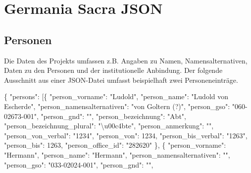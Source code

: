 \documentclass[ngerman,]{scrreprt}
\newenvironment{Shaded}{}{}
\newcommand{\DataTypeTok}[1]{\textcolor[rgb]{0.56,0.13,0.00}{#1}}
\newcommand{\DecValTok}[1]{\textcolor[rgb]{0.25,0.63,0.44}{#1}}
\newcommand{\CharTok}[1]{\textcolor[rgb]{0.25,0.44,0.63}{#1}}
\newcommand{\StringTok}[1]{\textcolor[rgb]{0.25,0.44,0.63}{#1}}
\newcommand{\OtherTok}[1]{\textcolor[rgb]{0.00,0.44,0.13}{#1}}
\newcommand{\FunctionTok}[1]{\textcolor[rgb]{0.02,0.16,0.49}{#1}}
\begin{document}
\section{Germania Sacra JSON}\label{germania-sacra-json}

\subsection{Personen}\label{personen}

Die Daten des Projekts umfassen z.B. Angaben zu Namen, Namensalternativen, Daten zu den Personen und der institutionelle Anbindung. Der folgende Ausschnitt aus einer JSON-Datei umfasst beispielhaft zwei Personeneinträge.

\begin{Shaded}
\begin{Highlighting}[]
\FunctionTok{\{}
    \DataTypeTok{"persons"}\FunctionTok{:} \OtherTok{[}\FunctionTok{\{}
        \DataTypeTok{"person_vorname"}\FunctionTok{:} \StringTok{"Ludold"}\FunctionTok{,}
        \DataTypeTok{"person_name"}\FunctionTok{:} \StringTok{"Ludold von Escherde"}\FunctionTok{,}
        \DataTypeTok{"person_namensalternativen"}\FunctionTok{:} \StringTok{"von Goltern (?)"}\FunctionTok{,}
        \DataTypeTok{"person_gso"}\FunctionTok{:} \StringTok{"060-02673-001"}\FunctionTok{,}
        \DataTypeTok{"person_gnd"}\FunctionTok{:} \StringTok{""}\FunctionTok{,}
        \DataTypeTok{"person_bezeichnung"}\FunctionTok{:} \StringTok{"Abt"}\FunctionTok{,}
        \DataTypeTok{"person_bezeichnung_plural"}\FunctionTok{:} \StringTok{"}\CharTok{\textbackslash{}u00c4}\StringTok{bte"}\FunctionTok{,}
        \DataTypeTok{"person_anmerkung"}\FunctionTok{:} \StringTok{""}\FunctionTok{,}
        \DataTypeTok{"person_von_verbal"}\FunctionTok{:} \StringTok{"1234"}\FunctionTok{,}
        \DataTypeTok{"person_von"}\FunctionTok{:} \DecValTok{1234}\FunctionTok{,}
        \DataTypeTok{"person_bis_verbal"}\FunctionTok{:} \StringTok{"1263"}\FunctionTok{,}
        \DataTypeTok{"person_bis"}\FunctionTok{:} \DecValTok{1263}\FunctionTok{,}
        \DataTypeTok{"person_office_id"}\FunctionTok{:} \StringTok{"282620"}
    \FunctionTok{\}}\OtherTok{,} \FunctionTok{\{}
        \DataTypeTok{"person_vorname"}\FunctionTok{:} \StringTok{"Hermann"}\FunctionTok{,}
        \DataTypeTok{"person_name"}\FunctionTok{:} \StringTok{"Hermann"}\FunctionTok{,}
        \DataTypeTok{"person_namensalternativen"}\FunctionTok{:} \StringTok{""}\FunctionTok{,}
        \DataTypeTok{"person_gso"}\FunctionTok{:} \StringTok{"033-02024-001"}\FunctionTok{,}
        \DataTypeTok{"person_gnd"}\FunctionTok{:} \StringTok{""}\FunctionTok{,}

\end{Highlighting}
\end{Shaded}
\end{document}
